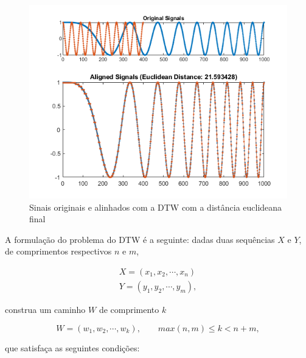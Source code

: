 \begin{figure}[htb]
\centering
\includegraphics[width=12cm]{figuras/DynamicTimeWarpingOfRealChirpAndSinusoidExample_01.png}
\caption{Sinais originais e alinhados com a DTW com a distância euclideana final \citep{matlab-dtw}}
\label{fig:matlab-dtw}
\end{figure}

\newcommand{\dist}{\mbox{dist}}

A formulação do problema \citep{salvador2007toward} do DTW é a seguinte: dadas duas sequências $X$ e $Y$, de comprimentos respectivos $n$ e $m$,

\begin{align*}
    X = (x_1, x_2, \cdots, x_n) \\
    Y = (y_1, y_2, \cdots, y_m),
\end{align*}

construa um caminho $W$ de comprimento $k$

\begin{equation*}
    W = (w_1, w_2, \cdots, w_k), \qquad max(n, m) \leq k < n + m,
\end{equation*}

\noindent que satisfaça as seguintes condições:

